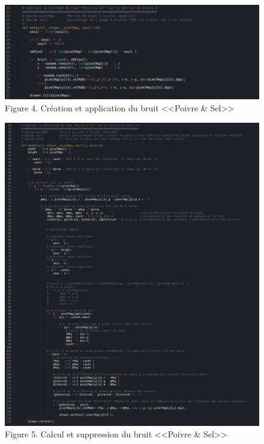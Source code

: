 \documentclass{article}
\begin{document}
		\begin{figure}
			\begin{center}
				\includegraphics[scale=.4]{st3/Salt&Pepper_SET.jpg}\\
				Figure 4. Création et application du bruit <<Poivre \& Sel>>
			\end{center}
			\begin{center}
				\includegraphics[scale=.34]{st3/Salt&Pepper_UNSET.jpg}\\
				Figure 5. Calcul et suppression du bruit <<Poivre \& Sel>>
			\end{center}
		\end{figure}
\end{document}

